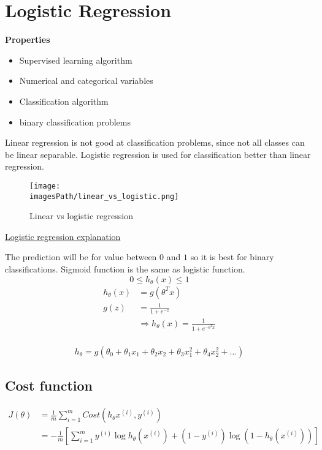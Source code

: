 \documentclass{article}
\newcommand{\imagesPath}{images}
\begin{document}

\newpage
\section{Logistic Regression}
\textbf{Properties}
\begin{itemize}
    \item Supervised learning algorithm
    \item Numerical and categorical variables 
    \item Classification algorithm
    \item binary classification problems 
\end{itemize}

Linear regression is not good at classification problems, since not all classes can 
be linear separable. Logistic regression is used for classification better than linear regression.
\begin{figure}[!h]
    \centering
    \texttt{[image: \\imagesPath/linear\_vs\_logistic.png]}
    \caption{Linear vs logistic regression}
\end{figure}
\href{https://www.youtube.com/watch?v=-la3q9d7AKQ}{Logistic regression explanation}

The prediction will be for value between $0$ and $1$ so it is best 
for binary classifications. Sigmoid function is the same as logistic function.
\begin{equation*}
    0 \leq h_{\theta}(x) \leq 1
\end{equation*}
\begin{align*}
    h_{\theta}(x) &= g(\theta^T x) \\
    g(z) &= \frac{1}{1+e^{-z}} \\
    &\Rightarrow h_{\theta}(x) = \frac{1}{1+e^{-\theta^T x}} \\
\end{align*}



\begin{equation*}
    h_{\theta} = g(\theta_0 + \theta_1 x_1 + \theta_2 x_2 + \theta_3 x_1^2 + \theta_4 x_2^2 + \ldots)
\end{equation*}

\subsection{Cost function}
\begin{align*}
    J(\theta) &= \frac{1}{m}\sum_{i=1}^m Cost(h_{\theta}x^{(i)},y^{(i)}) \\
    &= -\frac{1}{m}\left[\sum_{i=1}^m y^{(i)}\log{h_{\theta}(x^{(i)}) + (1-y^{(i)})\log(1-h_{\theta}(x^{(i)}))}\right] \\
\end{align*}
\end{document}
